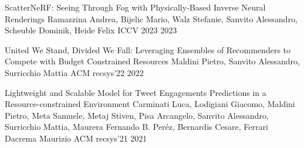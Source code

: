 



\begin{cvhonors}


  \cvhonor
    {ScatterNeRF: Seeing Through Fog with Physically-Based Inverse Neural Renderings} %
    {
    Ramazzina Andrea,
    Bijelic Mario,
    Walz Stefanie,
    Sanvito Alessandro,
    Scheuble Dominik,
    Heide Felix
    } %
    {ICCV 2023} %
    {2023} %

  \cvhonor
    {United We Stand, Divided We Fall: Leveraging Ensembles of Recommenders to Compete with Budget Constrained Resources} %
    {
    Maldini Pietro,
    Sanvito Alessandro,
    Surricchio Mattia
    } %
    {ACM recsys'22} %
    {2022} %


  \cvhonor
    {Lightweight and Scalable Model for Tweet Engagements Predictions in a Resource-constrained Environment} %
    {
    Carminati Luca, 
    Lodigiani Giacomo, 
    Maldini Pietro,
    Meta Samuele,
    Metaj Stiven,
    Pisa Arcangelo,
    Sanvito Alessandro,
    Surricchio Mattia,
    Maurera Fernando B. Peréz,
    Bernardis Cesare,
    Ferrari Dacrema Maurizio
    } %
    {ACM recsys'21} %
    {2021} %


\end{cvhonors}






